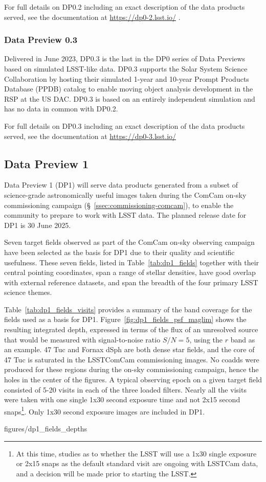 For full details on DP0.2 including an exact description of the data products served, see the documentation at \url{https://dp0-2.lsst.io/} .

\subsubsection{Data Preview 0.3}
\label{sec:dp03}

Delivered in June  2023, DP0.3 is the last in the DP0 series of Data Previews based on simulated LSST-like data.
DP0.3 supports the Solar System Science Collaboration by hosting their simulated 1-year and 10-year Prompt Products Database (PPDB) catalog to enable moving object analysis development in the RSP at the US DAC.
DP0.3 is based on an entirely independent simulation and has no data in common with DP0.2.

For full details on DP0.3 including an exact description of the data products served, see the documentation at \url{https://dp0-3.lsst.io/}

\subsection{Data Preview 1}
\label{ssec:dp1}

Data Preview 1 (DP1) will serve data products generated from a subset of science-grade astronomically useful images  taken  during  the ComCam on-sky commissioning campaign (\S~\ref{ssec:commissioning-comcam}), to enable the community to prepare to work with LSST data.
The planned release date for DP1 is 30 June 2025.

Seven target fields observed as part of the ComCam on-sky observing campaign  have been selected as the basis for DP1 due to their quality and scientific usefulness.
These seven fields, listed in Table~\ref{tab:dp1_fields} together with their central pointing coordinates, span a range of stellar densities, have good overlap with external reference datasets, and span the breadth of the four primary LSST science themes.


Table~\ref{tab:dp1_fields_visits} provides a summary of the band coverage for the  fields  used as a basis for DP1.
Figure~\ref{fig:dp1_fields_psf_maglim} shows the resulting integrated depth, expressed in terms of the flux of an unresolved source that would be measured with signal-to-noise ratio $S/N = 5$, using the $r$ band as an example.
47 Tuc and Fornax dSph are both dense star fields, and the core of 47 Tuc is saturated in the LSSTComCam commissioning images.
No coadds were produced for these regions during the on-sky commissioning campaign, hence the holes in the center of the figures.
A typical observing epoch on a given target field consisted of 5-20 visits in each of the three loaded filters.
Nearly all the visits  were taken with one single 1x30 second exposure time and not  2x15 second snaps\footnote{At this time, studies as to whether the LSST will use a 1x30 single exposure or 2x15 snaps as the default standard visit are ongoing with LSSTCam data, and a decision will be made prior to starting the LSST. }.
Only 1x30 second exposure images are included in DP1.

 {figures/dp1_fields_depths}

